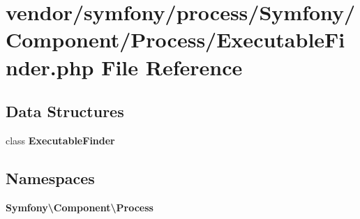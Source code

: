 \section{vendor/symfony/process/\+Symfony/\+Component/\+Process/\+Executable\+Finder.php File Reference}
\label{_executable_finder_8php}
\subsection*{Data Structures}
\begin{DoxyCompactItemize}
\item 
class {\bf Executable\+Finder}
\end{DoxyCompactItemize}
\subsection*{Namespaces}
\begin{DoxyCompactItemize}
\item 
 {\bf Symfony\textbackslash{}\+Component\textbackslash{}\+Process}
\end{DoxyCompactItemize}
